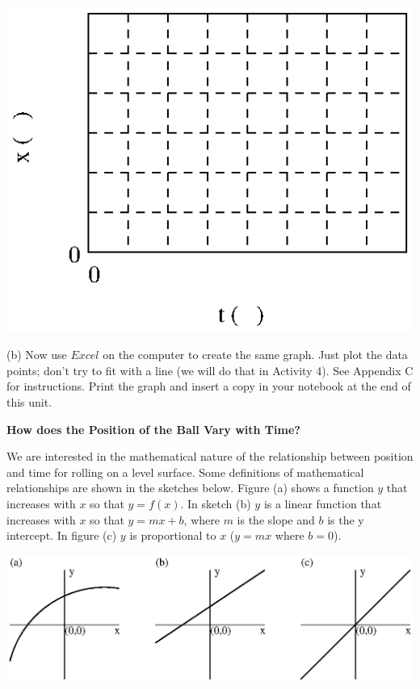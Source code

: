 \vspace{0.3cm}
{\par\centering \includegraphics{measuring/measuring_fig1.eps} \par}
\vspace{0.3cm}

(b) Now use $Excel$ on the computer to create the same graph. Just plot the 
data points; don't try to fit with a line (we will do that in Activity 4). 
See Appendix C for instructions. Print the graph and insert a copy in your 
notebook at the end of this unit.

\textbf{How does the Position of the Ball Vary with Time?} 

We are interested in the mathematical nature of the relationship between position
and time for rolling on a level surface. Some definitions of mathematical relationships
are shown in the sketches below. Figure (a) shows a function $y$ that increases
with $x$ so that $y = f(x)$. 
In sketch (b) $y$ is a linear function that increases
with $x$ so that $y = mx + b$, where 
$m$ is the slope and $b$ is the y intercept. In
figure (c) $y$ is proportional to $x$ ($y = mx$ where $b = 0$).

\vspace{0.3cm}
{\par\centering \includegraphics{measuring/measuring_fig2.eps} \par}
\vspace{0.3cm}

